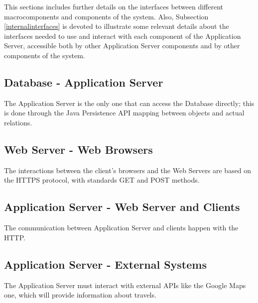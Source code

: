 This sections includes further details on the interfaces between different macrocomponents and components of the system. Also, Subsection \ref{internalinterfaces} is devoted to illustrate some relevant details about the interfaces needed to use and interact with each component of the Application Server, accessible both by other Application Server components and by other components of the system.

\subsection{Database - Application Server}
The Application Server is the only one that can access the Database directly; this is done through the Java Persistence API mapping between objects and actual relations.

\subsection{Web Server - Web Browsers}
The interactions between the client's browsers and the Web Servers are based on the HTTPS protocol, with standards GET and POST methods.

\subsection{Application Server - Web Server and Clients}
The communication between Application Server and clients happen with the HTTP.

\subsection{Application Server - External Systems}
The Application Server must interact with external APIs like the Google Maps one, which will provide information about travels.